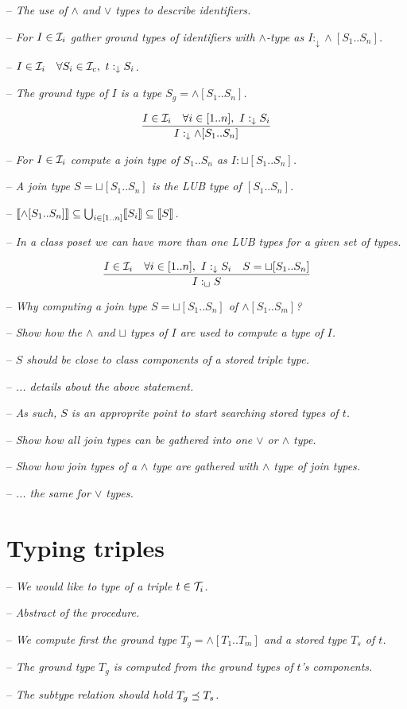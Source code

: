 \documentclass[runningheads]{llncs}
\newcommand{\darr}{\downarrow}
\newcommand{\llb}{\llbracket}
\newcommand{\rrb}{\rrbracket}
\newcommand{\I}{{\cal I}}
\newcommand{\T}{{\cal T}}
\newcommand{\notes}[1]{\noindent\begin{small}-- \emph{#1}\\\end{small}}
\newcommand{\nnotes}[1]{\indent\begin{small}-- \emph{#1}\\\end{small}}
\begin{document}
\medskip
\notes{The use of $\land$ and $\lor$ types to describe identifiers.}

\notes{For $I\in\I_i$ gather ground types of identifiers with $\land$-type as $I:_{\darr}\land[S_1..S_n]$.}
\nnotes{$I\in\I_i\quad\forall\/S_i\in\I_c,\ t:_{\darr}S_i$.}
\nnotes{The ground type of $I$ is a type $S_g=\land[S_1..S_n]$.}

\begin{equation}
\label{rul:land-1}
\dfrac{I\in\I_i\quad\forall\/i\in[1..n],\ I:_{\darr}S_i}
      {I:_{\darr}\land[S_1..S_n]}
\end{equation}


\notes{For $I\in\I_i$ compute a join type of $S_1..S_n$ as $I:\sqcup[S_1..S_n]$.}
\nnotes{A join type $S=\sqcup[S_1..S_n]$ is the LUB type of $[S_1..S_n]$.}
\nnotes{$\llb\land[S_1..S_n]\rrb\subseteq\bigcup_{i\in[1..n]}\llb\/S_i\rrb\subseteq\llb\/S\rrb$.}
\nnotes{In a class poset we can have more than one LUB types for a given set of types.}

\begin{equation}
\label{rul:lcup-1}
\dfrac{I\in\I_i\quad\forall\/i\in[1..n],\ I:_\darr\/S_i\quad\/S=\sqcup[S_1..S_n]}
      {I:_\sqcup\/S}
\end{equation}

\notes{Why computing a join type $S=\sqcup[S_1..S_n]$ of $\land[S_1..S_m]$?}
\nnotes{Show how the $\land$ and $\sqcup$ types of $I$ are used to compute a type of $I$.}
\nnotes{$S$ should be close to class components of a stored triple type.}
\nnotes{... details about the above statement.}
\nnotes{As such, $S$ is an approprite point to start searching stored types of $t$.}

\notes{Show how all join types can be gathered into one $\lor$ or $\land$ type.}
\nnotes{Show how join types of a $\land$ type are gathered with $\land$ type of join types.}
\nnotes{... the same for $\lor$ types.}





\section{Typing triples\label{sec:triples}}

\notes{We would like to type of a triple $t\in\T_i$.}
\nnotes{Abstract of the procedure.}
\nnotes{We compute first the ground type $T_g=\land[T_1..T_m]$ and a stored type $T_s$ of $t$.}
\nnotes{The ground type $T_g$ is computed from the ground types of $t$'s components.}
\nnotes{The subtype relation should hold $T_g\preceq\/T_s$.}
\end{document}
